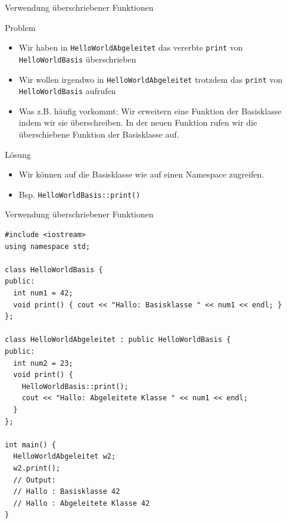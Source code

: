 \documentclass[presentation]{beamer}
\begin{document}
\begin{frame}[label={sec:org8b7bac5},fragile]{Verwendung überschriebener Funktionen}
 \begin{block}{Problem}
\begin{itemize}
\item Wir haben in {\color{solarizedYellow}\verb!HelloWorldAbgeleitet!} das vererbte {\color{solarizedYellow}\verb!print!} von
{\color{solarizedYellow}\verb!HelloWorldBasis!} überschrieben
\item Wir wollen irgendwo in {\color{solarizedYellow}\verb!HelloWorldAbgeleitet!} trotzdem das {\color{solarizedYellow}\verb!print!}
von {\color{solarizedYellow}\verb!HelloWorldBasis!} aufrufen
\item Was z.B. häufig vorkommt: Wir erweitern eine Funktion der
Basisklasse indem wir sie überschreiben. In der neuen Funktion rufen
wir die überschiebene Funktion der Basisklasse auf.
\end{itemize}
\end{block}
\begin{block}{Lösung}
\begin{itemize}
\item \alert{Wir können auf die Basisklasse wie auf einen Namespace zugreifen.}
\item Bsp. {\color{solarizedYellow}\verb!HelloWorldBasis::print()!}
\end{itemize}
\end{block}
\end{frame}
\begin{frame}[label={sec:org69a43d9},fragile]{Verwendung überschriebener Funktionen}
 \begin{verbatim}
#include <iostream>
using namespace std;

class HelloWorldBasis {
public:
  int num1 = 42;
  void print() { cout << "Hallo: Basisklasse " << num1 << endl; }
};

class HelloWorldAbgeleitet : public HelloWorldBasis {
public:
  int num2 = 23;
  void print() {
    HelloWorldBasis::print();
    cout << "Hallo: Abgeleitete Klasse " << num1 << endl;
  }
};

int main() {
  HelloWorldAbgeleitet w2;
  w2.print();
  // Output:
  // Hallo : Basisklasse 42
  // Hallo : Abgeleitete Klasse 42
}
\end{verbatim}
\end{frame}
\end{document}
